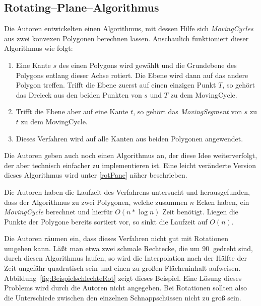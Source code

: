 \subsection{Rotating--Plane--Algorithmus}

Die Autoren entwickelten einen Algorithmus, mit dessen Hilfe sich \textit{MovingCycles} aus zwei konvexen Polygonen berechnen lassen. Anschaulich funktioniert dieser Algorithmus wie folgt:

\begin{enumerate}

\item Eine Kante $s$ des einen Polygons wird gewählt und die Grundebene des Polygons entlang dieser Achse rotiert. Die Ebene wird dann auf das andere Polygon treffen. Trifft die Ebene zuerst auf einen einzigen Punkt $T$, so gehört das Dreieck aus den beiden Punkten von $s$ und $T$ zu dem MovingCycle.

\item Trifft die Ebene aber auf eine Kante $t$, so gehört das \textit{MovingSegment} von $s$ zu $t$ zu dem MovingCycle.

\item Dieses Verfahren wird auf alle Kanten aus beiden Polygonen angewendet.
\end{enumerate}
Die Autoren geben auch noch einen Algorithmus an, der diese Idee weiterverfolgt, der aber technisch einfacher zu implementieren ist. Eine leicht veränderte Version dieses Algorithmus wird unter \vref{rotPane} näher beschrieben.

Die Autoren haben die Laufzeit des Verfahrens untersucht und herausgefunden, dass der Algorithmus zu zwei Polygonen, welche zusammen $n$ Ecken haben, ein \textit{MovingCycle} berechnet und hierfür $O(n*\log{n})$ Zeit benötigt. Liegen die Punkte der Polygone bereits sortiert vor, so sinkt die Laufzeit auf $O(n)$.

Die Autoren räumen ein, dass dieses Verfahren nicht gut mit Rotationen umgehen kann. Läßt man etwa zwei schmale Rechtecke, die um 90\degree$\:$ gedreht sind, durch diesen Algorithmus laufen, so wird die Interpolation nach der Hälfte der Zeit ungefähr quadratisch  sein und einen zu großen Flächeninhalt aufweisen. Abbildung~\vref{fig:BeispielschlechteRot} zeigt dieses Beispiel. Eine Lösung dieses Problems wird durch die Autoren nicht angegeben. Bei Rotationen sollten also die Unterschiede zwischen den einzelnen Schnappschüssen nicht zu groß sein.

